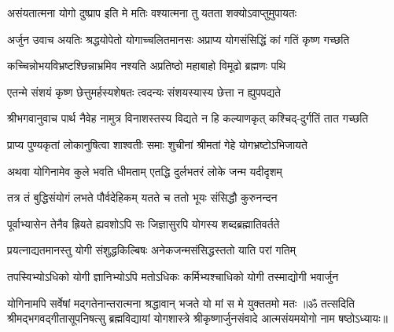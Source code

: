 \twolineshloka
{असंयतात्मना योगो दुष्प्राप इति मे मतिः}
{वश्यात्मना तु यतता शक्योऽवाप्तुमुपायतः}%

{अर्जुन उवाच}
\twolineshloka
{अयतिः श्रद्धयोपेतो योगाच्चलितमानसः}
{अप्राप्य योगसंसिद्धिं कां गतिं कृष्ण गच्छति}%

\twolineshloka
{कच्चिन्नोभयविभ्रष्टश्छिन्नाभ्रमिव नश्यति}
{अप्रतिष्ठो महाबाहो विमूढो ब्रह्मणः पथि}%

\twolineshloka
{एतन्मे संशयं कृष्ण छेत्तुमर्हस्यशेषतः}
{त्वदन्यः संशयस्यास्य छेत्ता न ह्युपपद्यते}%

{श्रीभगवानुवाच}
\twolineshloka
{पार्थ नैवेह नामुत्र विनाशस्तस्य विद्यते}
{न हि कल्याणकृत् कश्चिद्-दुर्गतिं तात गच्छति}%

\twolineshloka
{प्राप्य पुण्यकृतां लोकानुषित्वा शाश्वतीः समाः}
{शुचीनां श्रीमतां गेहे योगभ्रष्टोऽभिजायते}%

\twolineshloka
{अथवा योगिनामेव कुले भवति धीमताम्}
{एतद्धि दुर्लभतरं लोके जन्म यदीदृशम्}%

\twolineshloka
{तत्र तं बुद्धिसंयोगं लभते पौर्वदेहिकम्}
{यतते च ततो भूयः संसिद्धौ कुरुनन्दन}%

\twolineshloka
{पूर्वाभ्यासेन तेनैव ह्रियते ह्यवशोऽपि सः}
{जिज्ञासुरपि योगस्य शब्दब्रह्मातिवर्तते}%

\twolineshloka
{प्रयत्नाद्यतमानस्तु योगी संशुद्धकिल्बिषः}
{अनेकजन्मसंसिद्धस्ततो याति परां गतिम्}%

\twolineshloka
{तपस्विभ्योऽधिको योगी ज्ञानिभ्योऽपि मतोऽधिकः}
{कर्मिभ्यश्चाधिको योगी तस्माद्योगी भवार्जुन}%

\twolineshloka
{योगिनामपि सर्वेषां मद्गतेनान्तरात्मना}
{श्रद्धावान् भजते यो मां स मे युक्ततमो मतः}%
{॥ॐ तत्सदिति श्रीमद्भगवद्गीतासूपनिषत्सु ब्रह्मविद्यायां योगशास्त्रे श्रीकृष्णार्जुनसंवादे आत्मसंयमयोगो नाम षष्ठोऽध्यायः॥}